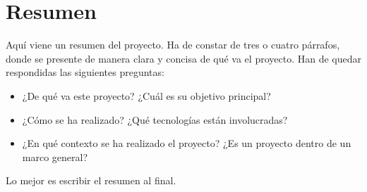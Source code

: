 \chapter*{Resumen}

Aqu\'i viene un resumen del proyecto. Ha de constar de tres o cuatro p\'arrafos,
donde se presente de manera clara y concisa de qu\'e va el proyecto. Han
de quedar respondidas las siguientes preguntas:

\begin{itemize}
  \item ¿De qu\'e va este proyecto? ¿Cu\'al es su objetivo principal?
  \item ¿C\'omo se ha realizado? ¿Qu\'e tecnolog\'ias est\'an involucradas?
  \item ¿En qu\'e contexto se ha realizado el proyecto? ¿Es un proyecto
dentro de un marco general?
\end{itemize}

Lo mejor es escribir el resumen al final.